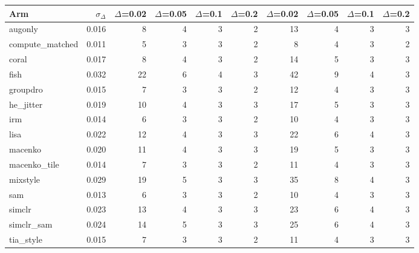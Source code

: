 \begin{tabular}{lrrrrrrrrr}
\toprule
Arm & $\sigma_\Delta$ & $\Delta$=0.02 & $\Delta$=0.05 & $\Delta$=0.1 & $\Delta$=0.2 & $\Delta$=0.02 & $\Delta$=0.05 & $\Delta$=0.1 & $\Delta$=0.2 \\
\midrule
augonly & 0.016 & 8 & 4 & 3 & 2 & 13 & 4 & 3 & 3 \\
compute\_matched & 0.011 & 5 & 3 & 3 & 2 & 8 & 4 & 3 & 2 \\
coral & 0.017 & 8 & 4 & 3 & 2 & 14 & 5 & 3 & 3 \\
fish & 0.032 & 22 & 6 & 4 & 3 & 42 & 9 & 4 & 3 \\
groupdro & 0.015 & 7 & 3 & 3 & 2 & 12 & 4 & 3 & 3 \\
he\_jitter & 0.019 & 10 & 4 & 3 & 3 & 17 & 5 & 3 & 3 \\
irm & 0.014 & 6 & 3 & 3 & 2 & 10 & 4 & 3 & 3 \\
lisa & 0.022 & 12 & 4 & 3 & 3 & 22 & 6 & 4 & 3 \\
macenko & 0.020 & 11 & 4 & 3 & 3 & 19 & 5 & 3 & 3 \\
macenko\_tile & 0.014 & 7 & 3 & 3 & 2 & 11 & 4 & 3 & 3 \\
mixstyle & 0.029 & 19 & 5 & 3 & 3 & 35 & 8 & 4 & 3 \\
sam & 0.013 & 6 & 3 & 3 & 2 & 10 & 4 & 3 & 3 \\
simclr & 0.023 & 13 & 4 & 3 & 3 & 23 & 6 & 4 & 3 \\
simclr\_sam & 0.024 & 14 & 5 & 3 & 3 & 25 & 6 & 4 & 3 \\
tia\_style & 0.015 & 7 & 3 & 3 & 2 & 11 & 4 & 3 & 3 \\
\bottomrule
\end{tabular}
